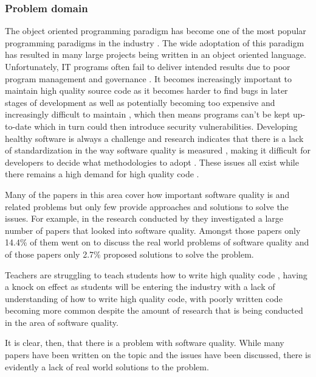 \subsubsection{Problem domain}

The object oriented programming paradigm has become one of the most popular programming paradigms in the industry \citep{6606742}. The wide adoptation of this paradigm has resulted in many large projects being written in an object oriented language.
Unfortunately, IT programs often fail to deliver intended results due to poor program management and governance \citep{7372958}. It becomes increasingly important to maintain high quality source code as it becomes harder to find bugs in later stages of development \citep{8681007} as well as potentially becoming too expensive and increasingly difficult to maintain \citep{8802820, 10.1145/2507288.2507312, 10.1145/3379597.3387457, 6606742, 7372958}, which then means programs can't be kept up-to-date which in turn could then introduce security vulnerabilities.
Developing healthy software is always a challenge \citep{8681007} and research indicates that there is a lack of standardization in the way software quality is measured \citep{6606742, 8681007}, making it difficult for developers to decide what methodologies to adopt \citep{6606742}. These issues all exist while there remains a high demand for high quality code \citep{6606742}.

Many of the papers in this area cover how important software quality is and related problems but only few provide approaches and solutions to solve the issues. For example, in the research conducted by \cite{6606742} they investigated a large number of papers that looked into software quality. Amongst those papers only 14.4\% of them went on to discuss the real world problems of software quality and of those papers only 2.7\% proposed solutions to solve the problem.

Teachers are struggling to teach students how to write high quality code \citep{10.1145/3428029.3428047}, having a knock on effect as students will be entering the industry with a lack of understanding of how to write high quality code, with poorly written code becoming more common despite the amount of research that is being conducted in the area of software quality.

It is clear, then, that there is a problem with software quality. While many papers have been written on the topic and the issues have been discussed, there is evidently a lack of real world solutions to the problem.
